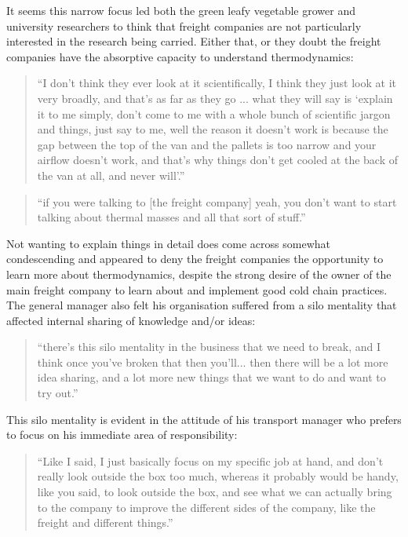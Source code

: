 It seems this narrow focus led both the green leafy vegetable grower and university researchers to think that freight companies are not particularly interested in the research being carried. Either that, or they doubt the freight companies have the absorptive capacity to understand thermodynamics:

\begin{quote}
\small
\enquote{I don't think they ever look at it scientifically, I think they just look at it very broadly, and that's as far as they go ... what they will say is \enquote{explain it to me simply, don't come to me with a whole bunch of scientific jargon and things, just say to me, well the reason it doesn't work is because the gap between the top of the van and the pallets is too narrow and your airflow doesn't work, and that's why things don't get cooled at the back of the van at all, and never will}.} \\
\end{quote}

\begin{quote}
\small
\enquote{if you were talking to [the freight company] yeah, you don't want to start talking about thermal masses and all that sort of stuff.} \\
\end{quote}

Not wanting to explain things in detail does come across somewhat condescending and appeared to deny the freight companies the opportunity to learn more about thermodynamics, despite the strong desire of the owner of the main freight company to learn about and implement good cold chain practices. The general manager also felt his organisation suffered from a silo mentality that affected internal sharing of knowledge and/or ideas: 

\begin{quote}
\small
\enquote{there’s this silo mentality in the business that we need to break, and I think once you've broken that then you'll... then there will be a lot more idea sharing, and a lot more new things that we want to do and want to try out.} \\
\end{quote}

This silo mentality is evident in the attitude of his transport manager who prefers to focus on his immediate area of responsibility: 

\begin{quote}
\small
\enquote{Like I said, I just basically focus on my specific job at hand, and don't really look outside the box too much, whereas it probably would be handy, like you said, to look outside the box, and see what we can actually bring to the company to improve the different sides of the company, like the freight and different things.} \\
\end{quote}

